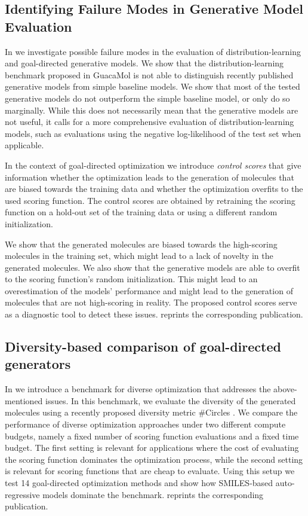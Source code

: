 \subsection{Identifying Failure Modes in Generative Model Evaluation}
In \citep{renzFailureModesMolecule2019} we investigate possible failure modes in the evaluation of
distribution-learning and goal-directed generative models. We show that the distribution-learning
benchmark proposed in GuacaMol \citep{brownGuacaMolBenchmarkingModels2019} is not able to
distinguish recently published generative models from simple baseline models. We show that most of
the tested generative models do not outperform the simple baseline model, or only do so marginally.
While this does not necessarily mean that the generative models are not useful, it calls for a more
comprehensive evaluation of distribution-learning models, such as evaluations using the negative
log-likelihood of the test set when applicable.

In the context of goal-directed optimization we introduce \emph{control scores} that give
information whether the optimization leads to the generation of molecules that are biased towards the
training data and whether the optimization overfits to the used scoring function.
The control scores are obtained by retraining the scoring function on a hold-out set of the training
data or using a different random initialization.

We show that the generated molecules are biased towards the high-scoring molecules in the training
set, which might lead to a lack of novelty in the generated molecules. We also show that the
generative models are able to overfit to the scoring function's random initialization.
This might lead to an overestimation of the models' performance and might lead to the generation of
molecules that are not high-scoring in reality. The proposed control scores serve as a diagnostic
tool to detect these issues.  reprints the corresponding publication.

\subsection{Diversity-based comparison of goal-directed generators\label{sec:divopt}} In
\citep{renzDiverseHitsNovo2024} we introduce a benchmark for diverse optimization
that addresses the above-mentioned issues. In this benchmark, we evaluate the diversity of the
generated molecules using a recently proposed diversity metric \#Circles
\citep{xieHowMuchSpace2023}. We compare the performance of diverse optimization approaches under two
different compute budgets, namely a fixed number of scoring function evaluations and a fixed time
budget. The first setting is relevant for applications where the cost of evaluating the scoring
function dominates the optimization process, while the second setting is relevant for scoring
functions that are cheap to evaluate. Using this setup we test 14 goal-directed optimization methods
and show how SMILES-based auto-regressive models dominate the benchmark. 
reprints the corresponding publication.

